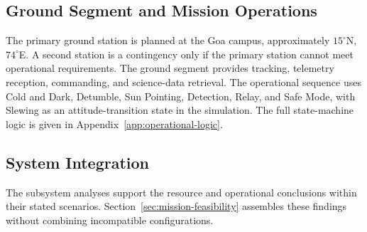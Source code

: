 
\subsection{Ground Segment and Mission Operations}\label{ground-segment-mission-operations}
The primary ground station is planned at the Goa campus, approximately $15^\circ$N, $74^\circ$E. A second station is a contingency only if the primary station cannot meet operational requirements. The ground segment provides tracking, telemetry reception, commanding, and science-data retrieval. The operational sequence uses Cold and Dark, Detumble, Sun Pointing, Detection, Relay, and Safe Mode, with Slewing as an attitude-transition state in the simulation. The full state-machine logic is given in Appendix~\ref{app:operational-logic}.


\subsection{System Integration}
The subsystem analyses support the resource and operational conclusions within their stated scenarios. Section~\ref{sec:mission-feasibility} assembles these findings without combining incompatible configurations.

